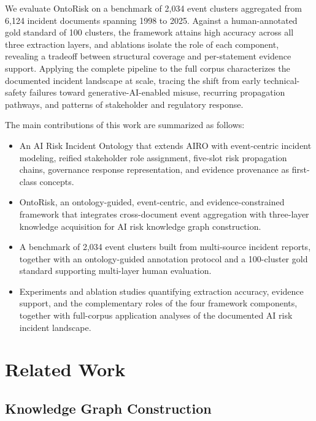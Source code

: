 \documentclass[a4paper,fleqn]{cas-dc}
\begin{document}
We evaluate OntoRisk on a benchmark of 2{,}034 event clusters
aggregated from 6{,}124 incident documents spanning 1998 to 2025.
Against a human-annotated gold standard of 100 clusters, the
framework attains high accuracy across all three extraction layers,
and ablations isolate the role of each component, revealing a
tradeoff between structural coverage and per-statement
evidence support. Applying the complete pipeline to the full corpus
characterizes the documented incident landscape at scale, tracing the
shift from early technical-safety failures toward
generative-AI-enabled misuse, recurring propagation pathways, and
patterns of stakeholder and regulatory response.

The main contributions of this work are summarized as follows:

\begin{itemize}
\item An AI Risk Incident Ontology that extends AIRO with
event-centric incident modeling, reified stakeholder role
assignment, five-slot risk propagation chains, governance response
representation, and evidence provenance as first-class concepts.

\item OntoRisk, an ontology-guided, event-centric, and
evidence-constrained framework that integrates cross-document event
aggregation with three-layer knowledge acquisition for AI risk
knowledge graph construction.

\item A benchmark of 2{,}034 event clusters built from multi-source
incident reports, together with an ontology-guided annotation
protocol and a 100-cluster gold standard supporting multi-layer
human evaluation.

\item Experiments and ablation studies quantifying extraction
accuracy, evidence support, and the
complementary roles of the four framework components, together with
full-corpus application analyses of the documented AI risk incident
landscape.
\end{itemize}

\section{Related Work}
\subsection{Knowledge Graph Construction}
\end{document}
